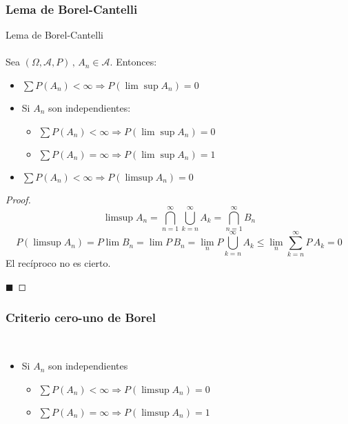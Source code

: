 \documentclass[12pt,a4paper]{book}
\newcommand*{\qed}{\hfill\ensuremath{\blacksquare}}
\begin{document}
\subsubsection{Lema de Borel-Cantelli}
\begin{lemma}
Lema de Borel-Cantelli
\\\\
Sea $(\Omega,\mathcal{A},P) \, , \, A_n \in \mathcal{A}$. Entonces:
\begin{itemize}
\item $\displaystyle\sum P(A_n) < \infty \Longrightarrow P(\displaystyle \lim \sup A_n)=0$
\item Si $ A_n$ son independientes:
\begin{itemize}
\item $\displaystyle\sum P(A_n) < \infty \Longrightarrow P(\displaystyle \lim \sup A_n)=0$
\item $\displaystyle\sum P(A_n) = \infty \Longrightarrow P(\displaystyle \lim \sup A_n)=1$
\end{itemize}
\item $\displaystyle\sum P(A_n) < \infty \Longrightarrow P(\displaystyle \limsup A_n)=0$
\end{itemize}
\end{lemma}

\begin{proof}
	$$\limsup A_n=\bigcap_{n=1}^\infty \bigcup_{k=n}^{\infty}A_k=\bigcap_{n=1}^\infty B_n$$
	$$P(\limsup A_n)=P\lim B_n=\lim P\, B_n = \lim_n P\bigcup_{k=n}^\infty A_k \leq \lim_n \sum_{k=n}^\infty P\, A_k=0$$
	El recíproco no es cierto.
	
\qed
\end{proof}

\subsubsection{Criterio cero-uno de Borel}
\begin{criterion} 
	\ 
\begin{itemize}
\item Si $ A_n$ son independientes 
	\begin{itemize}
	\item $\displaystyle\sum P(A_n) < \infty \Longrightarrow P(\displaystyle \limsup A_n)=0$
	\item $\displaystyle\sum P(A_n) = \infty \Longrightarrow P(\displaystyle \limsup A_n)=1$
	\end{itemize}
\end{itemize}
\end{criterion}
\end{document}
